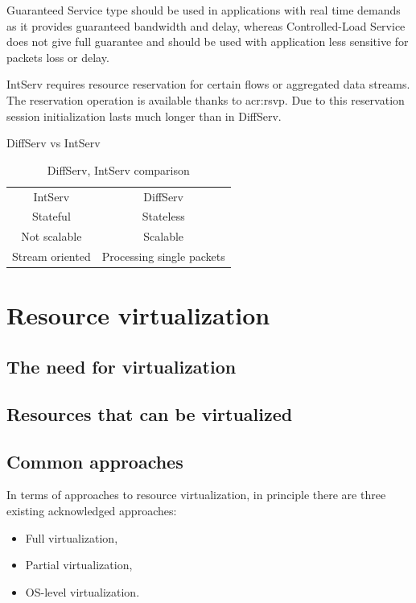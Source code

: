 \documentclass[11pt]{book}
\begin{document}
        Guaranteed Service type should be used in applications with real time demands as it provides guaranteed
        bandwidth and delay, whereas Controlled-Load Service does not give full guarantee and should be used with
        application less sensitive for packets loss or delay.

        IntServ requires resource reservation for certain flows or aggregated data streams. The reservation operation is
        available thanks to \gls{acr:rsvp}. Due to this reservation session initialization lasts much longer than in
        DiffServ.

        {DiffServ vs IntServ}

        \begin{table}[ht]
          \caption{DiffServ, IntServ comparison}
          \centering %
          \begin{tabular}{c c}
            \hline \hline
            IntServ         & DiffServ \\
            Stateful        & Stateless \\
            Not scalable    & Scalable \\
            Stream oriented & Processing single packets \\
            \hline
          \end{tabular}
        \end{table}


    \section{Resource virtualization}
    \label{sec:ctx:virt}


      \subsection{The need for virtualization}

      \subsection{Resources that can be virtualized}

      \subsection{Common approaches}

	In terms of approaches to resource virtualization, in principle there are three existing acknowledged approaches:
	\begin{itemize}
		\item{Full virtualization,}
		\item{Partial virtualization,}
		\item{OS-level virtualization.}
	\end{itemize}
\end{document}
